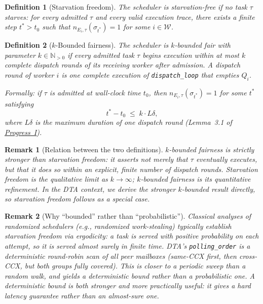 \documentclass[11pt,a4paper]{report}
\newtheorem{definition}{Definition}[section]
\newtheorem{remark}{Remark}[section]
\newcommand{\code}[1]{\texttt{#1}}
\begin{document}
\begin{definition}[Starvation freedom]
\label{def:starve-free}
The scheduler is \emph{starvation-free} if no task $\tau$ starves:
for every admitted $\tau$ and every valid execution trace,
there exists a finite step $t^* > t_0$ such that
$n_{E_i, \tau}(\sigma_{t^*}) = 1$ for some $i \in \mathcal{W}$.
\end{definition}

\begin{definition}[$k$-Bounded fairness]

The scheduler is \emph{$k$-bounded fair} with parameter $k \in
\mathbb{N}_{>0}$ if every admitted task $\tau$ begins execution
within at most $k$ complete dispatch rounds of its receiving
worker after admission.  A \emph{dispatch round} of worker $i$
is one complete execution of \code{dispatch\_loop} that empties
$Q_i$.

Formally: if $\tau$ is admitted at wall-clock time $t_0$, then
$n_{E_i, \tau}(\sigma_{t^*}) = 1$ for some $t^*$ satisfying
\[
  t^* - t_0 \;\leq\; k \cdot L\delta,
\]
where $L\delta$ is the maximum duration of one dispatch round
(Lemma~3.1 of \hyperref[chap:bounded_wait]{Progress~I}).
\end{definition}

\begin{remark}[Relation between the two definitions]
$k$-bounded fairness is strictly stronger than starvation freedom:
it asserts not merely that $\tau$ \emph{eventually} executes, but
that it does so within an \emph{explicit, finite} number of dispatch
rounds.  Starvation freedom is the qualitative limit as
$k \to \infty$; $k$-bounded fairness is its quantitative
refinement.  In the DTA context, we derive the stronger
$k$-bounded result directly, so starvation freedom follows as a
special case.
\end{remark}

\begin{remark}[Why ``bounded'' rather than ``probabilistic'']
Classical analyses of randomized schedulers (e.g., randomized
work-stealing) typically establish starvation freedom via ergodicity:
a task is served with positive probability on each attempt, so it
is served almost surely in finite time.  DTA's \code{polling\_order}
is a \emph{deterministic} round-robin scan of all peer mailboxes
(same-CCX first, then cross-CCX, but both groups fully covered).
This is closer to a \emph{periodic sweep} than a random walk, and
yields a deterministic bound rather than a probabilistic one.
A deterministic bound is both stronger and more practically useful:
it gives a hard latency guarantee rather than an almost-sure one.
\end{remark}
\end{document}
